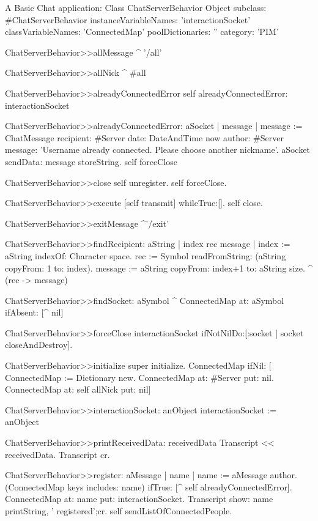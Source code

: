 \documentclass[a4paper,10pt,twoside]{book}
\begin{document}
\begin{script}{A Basic Chat application: Class ChatServerBehavior}
Object subclass: #ChatServerBehavior
	instanceVariableNames: 'interactionSocket'
	classVariableNames: 'ConnectedMap'
	poolDictionaries: ''
	category: 'PIM'

ChatServerBehavior>>allMessage
	^ '/all'

ChatServerBehavior>>allNick
	^ #all

ChatServerBehavior>>alreadyConnectedError
	self alreadyConnectedError: interactionSocket

ChatServerBehavior>>alreadyConnectedError: aSocket
	| message |
	message := ChatMessage
					recipient: #Server
					date: DateAndTime now
					author: #Server
					message: 'Username already connected. Please choose another nickname'.					
	aSocket sendData: message storeString.
	self forceClose

ChatServerBehavior>>close
	self unregister.
	self forceClose.

ChatServerBehavior>>execute
	[self transmit] whileTrue:[].
	self close.

ChatServerBehavior>>exitMessage
	^'/exit'

ChatServerBehavior>>findRecipient: aString
	| index rec message |
	index := aString indexOf: Character space.
	rec := Symbol readFromString: (aString copyFrom: 1 to: index).
	message := aString copyFrom: index+1 to: aString size.
	^ (rec -> message)

ChatServerBehavior>>findSocket: aSymbol
	^ ConnectedMap at: aSymbol ifAbsent: [^ nil]

ChatServerBehavior>>forceClose
	interactionSocket ifNotNilDo:[:socket | socket closeAndDestroy].

ChatServerBehavior>>initialize
	super initialize.
	ConnectedMap 
		ifNil: [
			ConnectedMap := Dictionary new.
			ConnectedMap at: #Server put: nil.
			ConnectedMap at: self allNick put: nil]

ChatServerBehavior>>interactionSocket: anObject
	interactionSocket := anObject

ChatServerBehavior>>printReceivedData: receivedData
	Transcript << receivedData.
	Transcript cr.

ChatServerBehavior>>register: aMessage
	| name |
	name := aMessage author.
	(ConnectedMap keys includes: name)
		ifTrue: [^ self alreadyConnectedError].
	ConnectedMap at: name put: interactionSocket.
	Transcript show: name printString, ' registered';cr.
	self sendListOfConnectedPeople.


\end{script}
\end{document}
